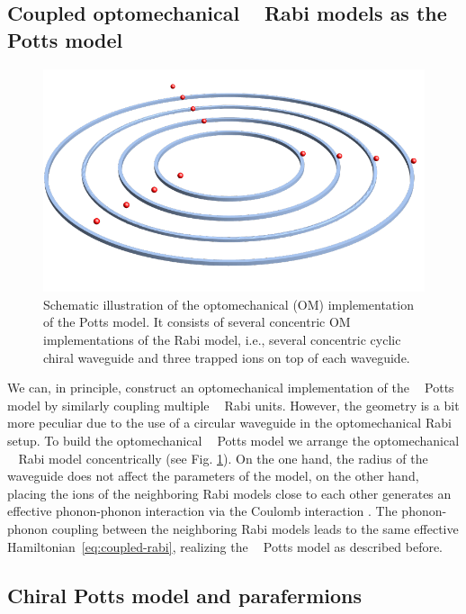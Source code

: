 \documentclass[reprint, aps, prx, amsmath, amssymb, longbibliography, superscriptaddress]{revtex4-2}
\DeclareMathOperator{\Zthree}{\mathbb{Z}_3}
\begin{document}
\subsection{Coupled optomechanical \texorpdfstring{$\Zthree$}{Z3} Rabi models as the Potts model}

\begin{figure}[t]
    \centering
    \includegraphics[width = 0.8 \linewidth]{pics/optomechanical_Potts_pic.pdf}
    \caption{Schematic illustration of the optomechanical (OM) implementation of the Potts model. It consists of several concentric OM implementations of the Rabi model, i.e., several concentric cyclic chiral waveguide and three trapped ions on top of each waveguide.}
    \label{fig:optomechanical-potts}
\end{figure}

We can, in principle, construct an optomechanical implementation of the $\Zthree$ Potts model by similarly coupling multiple $\Zthree$ Rabi units. However, the geometry is a bit more peculiar due to the use of a circular waveguide in the optomechanical Rabi setup. To build the optomechanical $\Zthree$ Potts model we arrange the optomechanical $\Zthree$ Rabi model concentrically (see Fig. \ref{fig:optomechanical-potts}). On the one hand, the radius of the waveguide does not affect the parameters of the model, on the other hand, placing the ions of the neighboring Rabi models close to each other generates an effective phonon-phonon interaction via the Coulomb interaction \cite{schneider_experimental_2012,timm_dynamics_2023}. The phonon-phonon coupling between the neighboring Rabi models leads to the same effective Hamiltonian~\eqref{eq:coupled-rabi}, realizing the $\Zthree$ Potts model as described before.


\subsection{Chiral Potts model and parafermions}
\end{document}
